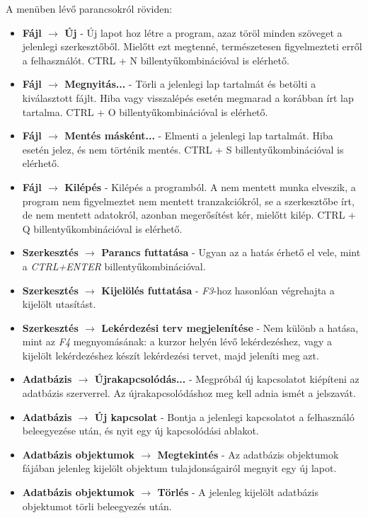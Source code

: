 A menüben lévő parancsokról röviden:
\begin{itemize}
  \item \textbf{Fájl $\rightarrow$ Új} - Új lapot hoz létre a program, azaz töröl minden szöveget a jelenlegi szerkesztőből. Mielőtt ezt megtenné,
természetesen figyelmezteti erről a felhasználót. CTRL + N billentyűkombinációval is elérhető.
  \item \textbf{Fájl $\rightarrow$ Megnyitás...} - Törli a jelenlegi lap tartalmát és betölti a kiválasztott fájlt. Hiba vagy visszalépés esetén
  megmarad a korábban írt lap tartalma. CTRL + O billentyűkombinációval is elérhető.
  \item \textbf{Fájl $\rightarrow$ Mentés másként...} - Elmenti a jelenlegi lap tartalmát. Hiba esetén jelez, és nem történik mentés.
  CTRL + S billentyűkombinációval is elérhető.
  \item \textbf{Fájl $\rightarrow$ Kilépés} - Kilépés a programból. A nem mentett munka elveszik, a program nem figyelmeztet nem mentett tranzakciókról,
  se a szerkesztőbe írt, de nem mentett adatokról, azonban megerősítést kér, mielőtt kilép. CTRL + Q billentyűkombinációval is elérhető.
  \item \textbf{Szerkesztés $\rightarrow$ Parancs futtatása} - Ugyan az a hatás érhető el vele, mint a \textit{CTRL+ENTER} billentyűkombinációval.
  \item \textbf{Szerkesztés $\rightarrow$ Kijelölés futtatása} - \textit{F3}-hoz hasonlóan végrehajta a kijelölt utasítást.
  \item \textbf{Szerkesztés $\rightarrow$ Lekérdezési terv megjelenítése} - Nem különb a hatása, mint az \textit{F4} megnyomásának: a kurzor helyén lévő lekérdezéshez,
  vagy a kijelölt lekérdezéshez készít lekérdezési tervet, majd jeleníti meg azt.
  \item \textbf{Adatbázis $\rightarrow$ Újrakapcsolódás...} - Megpróbál új kapcsolatot kiépíteni az adatbázis szerverrel. Az újrakapcsolódáshoz meg kell adnia ismét
  a jelszavát.
  \item \textbf{Adatbázis $\rightarrow$ Új kapcsolat} - Bontja a jelenlegi kapcsolatot a felhasználó beleegyezése után, és nyit egy új kapcsolódási ablakot.
  \item \textbf{Adatbázis objektumok $\rightarrow$ Megtekintés} - Az adatbázis objektumok fájában jelenleg kijelölt objektum tulajdonságairól megnyit egy új lapot.
  \item \textbf{Adatbázis objektumok $\rightarrow$ Törlés} - A jelenleg kijelölt adatbázis objektumot törli beleegyezés után.
\end{itemize}

